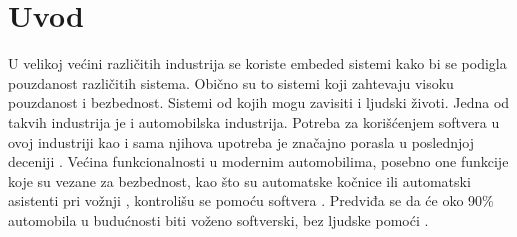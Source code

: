 \documentclass{article}
\begin{document}
\section{Uvod}

U velikoj većini različitih industrija se koriste embeded sistemi kako bi se podigla pouzdanost različitih sistema. Obično su to sistemi koji zahtevaju visoku pouzdanost i bezbednost. Sistemi od kojih mogu zavisiti i ljudski životi. Jedna od takvih industrija je i automobilska industrija. Potreba za korišćenjem softvera u ovoj industriji kao i sama njihova upotreba je značajno porasla u poslednjoj deceniji \cite{ref1}\cite{ref2}. Većina funkcionalnosti u modernim automobilima, posebno one funkcije koje su vezane za bezbednost, kao što su automatske kočnice ili automatski asistenti pri vožnji \cite{ref3}, kontrolišu se pomoću softvera \cite{ref4}. Predviđa se da će oko 90\% automobila u budućnosti biti voženo softverski, bez ljudske pomoći \cite{ref2}.
\end{document}

